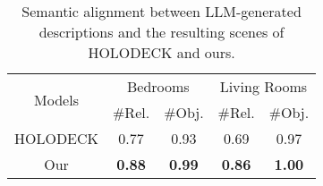 \begin{table}
\centering
\setlength{\tabcolsep}{8.5pt}
\begin{tabular}{ccccc}
\hline
\multirow{2}{*}{Models}    & \multicolumn{2}{c}{Bedrooms}  &      \multicolumn{2}{c}{Living Rooms}  \\
\cline{2-5}
         & $\#$Rel. & $\#$Obj. & $\#$Rel. & $\#$Obj.  \\
\hline

HOLODECK & 0.77 & 0.93 &  0.69 & 0.97 \\
\hline

Our & \textbf{0.88} & \textbf{0.99} & \textbf{0.86} &  \textbf{1.00} \\
\hline
\end{tabular}
\caption{Semantic alignment between LLM-generated descriptions and the resulting scenes of HOLODECK and ours.}
\label{tab:comparison_holo}
\end{table}